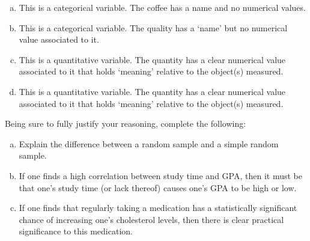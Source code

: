 \documentclass[11pt,letterpaper]{article}
\begin{document}
\sol 
\begin{enumerate}[(a)]
\item This is a categorical variable. The coffee has a name and no numerical values. \pspace

\item This is a categorical variable. The quality has a `name' but no numerical value associated to it. \pspace

\item This is a quantitative variable. The quantity has a clear numerical value associated to it that holds `meaning' relative to the object(s) measured. \pspace

\item This is a quantitative variable. The quantity has a clear numerical value associated to it that holds `meaning' relative to the object(s) measured.  
\end{enumerate}



\newpage



 Being sure to fully justify your reasoning, complete the following:
	\begin{enumerate}[(a)]
	\item Explain the difference between a random sample and a simple random sample. 
	\item If one finds a high correlation between study time and GPA, then it must be that one's study time (or lack thereof) causes one's GPA to be high or low. 
	\item If one finds that regularly taking a medication has a statistically significant chance of increasing one's cholesterol levels, then there is clear practical significance to this medication. 
	\end{enumerate} \pspace
\end{document}

